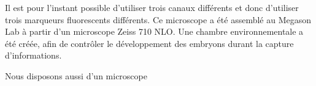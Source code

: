 Il est pour l'instant possible d'utiliser trois canaux différents et donc d'utiliser trois marqueurs fluorescents différents.
Ce microscope a été assemblé au Megason Lab à partir d'un microscope Zeiss 710 NLO.
Une chambre environnementale a été créée, afin de contrôler le développement des embryons durant la capture d'informations.

Nous disposons aussi d'un microscope 




%







